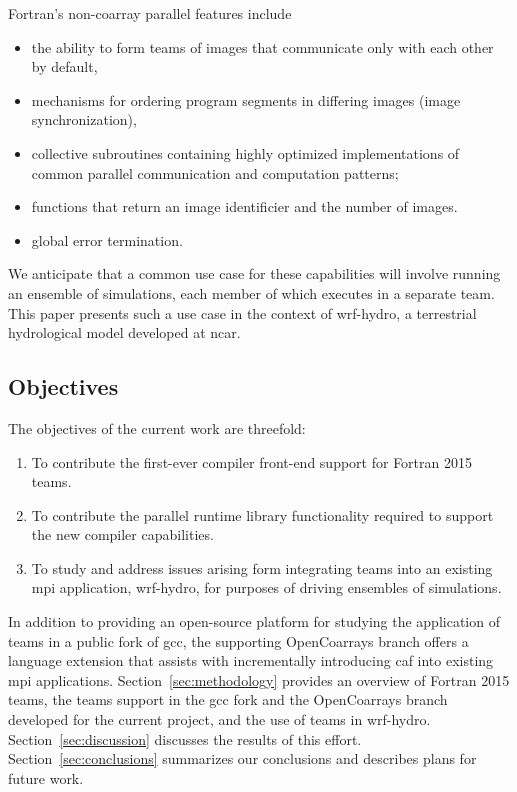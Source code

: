 Fortran's non-\gls{coarray} parallel features include
\begin{itemize}
   \item the ability to form teams of images that communicate only with each other by default,
   \item mechanisms for ordering program segments in differing images (image synchronization),
   \item collective subroutines containing highly optimized implementations of common parallel
         communication and computation patterns;
   \item functions that return an image identificier and the number of images.
   \item global error termination.
\end{itemize}
We anticipate that a common use case for these capabilities will involve running an ensemble of simulations, each member of
which executes in a separate team.  This paper presents such a use case in the context of \gls{wrf-hydro}, a terrestrial
hydrological model developed at \gls{ncar}.


\subsection{Objectives}\label{sec:objectives}
The objectives of the current work are threefold:
\begin{enumerate}
  \item To contribute the first-ever compiler front-end support for Fortran 2015 teams.
  \item To contribute the parallel runtime library functionality required to support the new compiler capabilities.
  \item To study and address issues arising form integrating teams into an existing \gls{mpi} application, \gls{wrf-hydro}, for purposes of driving ensembles of simulations.
\end{enumerate}
In addition to providing an open-source platform for studying the application of teams in a public fork of \gls{gcc},  the
supporting OpenCoarrays branch offers a language extension that assists with incrementally introducing \gls{caf} into existing
\gls{mpi} applications.  Section~\ref{sec:methodology} provides an overview of Fortran 2015 teams, the teams support in the
\gls{gcc} fork and the OpenCoarrays branch developed for the current project, and the use of teams in \gls{wrf-hydro}.
Section~\ref{sec:discussion} discusses the results of this effort. Section~\ref{sec:conclusions} summarizes our conclusions
and describes plans for future work.

